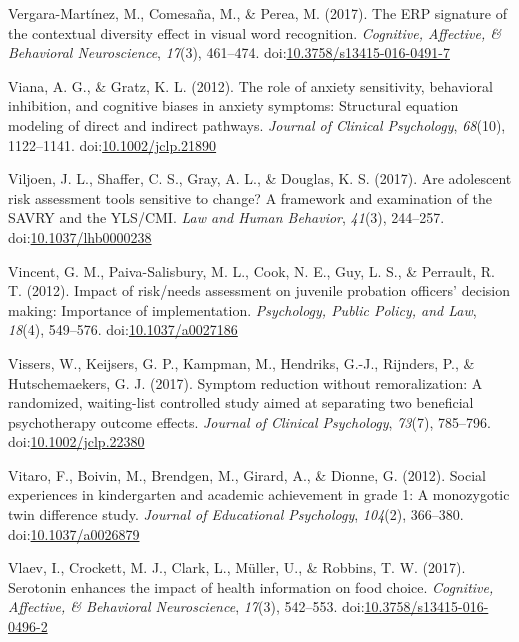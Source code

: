 \documentclass[english,man]{apa6}
\theoremstyle{definition}
\theoremstyle{definition}
\theoremstyle{definition}
\theoremstyle{remark}
\begin{document}
\hypertarget{ref-Vergara-Martinez2017}{}
Vergara-Martínez, M., Comesaña, M., \& Perea, M. (2017). The ERP
signature of the contextual diversity effect in visual word recognition.
\emph{Cognitive, Affective, \& Behavioral Neuroscience}, \emph{17}(3),
461--474.
doi:\href{https://doi.org/10.3758/s13415-016-0491-7}{10.3758/s13415-016-0491-7}

\hypertarget{ref-Viana2012}{}
Viana, A. G., \& Gratz, K. L. (2012). The role of anxiety sensitivity,
behavioral inhibition, and cognitive biases in anxiety symptoms:
Structural equation modeling of direct and indirect pathways.
\emph{Journal of Clinical Psychology}, \emph{68}(10), 1122--1141.
doi:\href{https://doi.org/10.1002/jclp.21890}{10.1002/jclp.21890}

\hypertarget{ref-Viljoen2017}{}
Viljoen, J. L., Shaffer, C. S., Gray, A. L., \& Douglas, K. S. (2017).
Are adolescent risk assessment tools sensitive to change? A framework
and examination of the SAVRY and the YLS/CMI. \emph{Law and Human
Behavior}, \emph{41}(3), 244--257.
doi:\href{https://doi.org/10.1037/lhb0000238}{10.1037/lhb0000238}

\hypertarget{ref-Vincent2012}{}
Vincent, G. M., Paiva-Salisbury, M. L., Cook, N. E., Guy, L. S., \&
Perrault, R. T. (2012). Impact of risk/needs assessment on juvenile
probation officers' decision making: Importance of implementation.
\emph{Psychology, Public Policy, and Law}, \emph{18}(4), 549--576.
doi:\href{https://doi.org/10.1037/a0027186}{10.1037/a0027186}

\hypertarget{ref-Vissers2017}{}
Vissers, W., Keijsers, G. P., Kampman, M., Hendriks, G.-J., Rijnders,
P., \& Hutschemaekers, G. J. (2017). Symptom reduction without
remoralization: A randomized, waiting-list controlled study aimed at
separating two beneficial psychotherapy outcome effects. \emph{Journal
of Clinical Psychology}, \emph{73}(7), 785--796.
doi:\href{https://doi.org/10.1002/jclp.22380}{10.1002/jclp.22380}

\hypertarget{ref-Vitaro2012}{}
Vitaro, F., Boivin, M., Brendgen, M., Girard, A., \& Dionne, G. (2012).
Social experiences in kindergarten and academic achievement in grade 1:
A monozygotic twin difference study. \emph{Journal of Educational
Psychology}, \emph{104}(2), 366--380.
doi:\href{https://doi.org/10.1037/a0026879}{10.1037/a0026879}

\hypertarget{ref-Vlaev2017}{}
Vlaev, I., Crockett, M. J., Clark, L., Müller, U., \& Robbins, T. W.
(2017). Serotonin enhances the impact of health information on food
choice. \emph{Cognitive, Affective, \& Behavioral Neuroscience},
\emph{17}(3), 542--553.
doi:\href{https://doi.org/10.3758/s13415-016-0496-2}{10.3758/s13415-016-0496-2}
\end{document}
